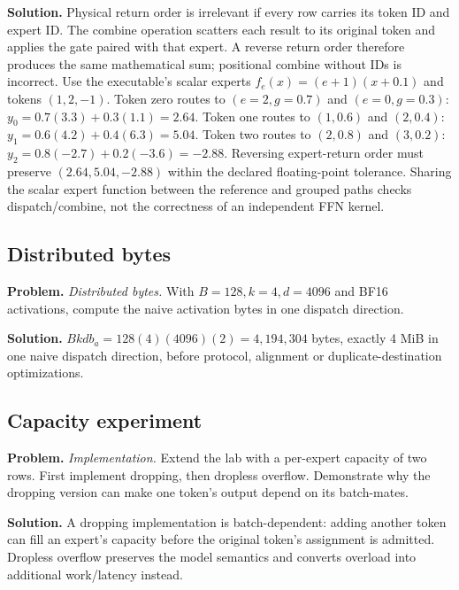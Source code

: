 \textbf{Solution.} Physical return order is irrelevant if every row carries its token ID and expert ID.
The combine operation scatters each result to its original token and applies the gate
paired with that expert. A reverse return order therefore produces the same mathematical
sum; positional combine without IDs is incorrect.
Use the executable's scalar experts $f_e(x)=(e+1)(x+0.1)$ and tokens
$(1,2,-1)$. Token zero routes to $(e=2,g=0.7)$ and $(e=0,g=0.3)$:
$y_0=0.7(3.3)+0.3(1.1)=2.64$. Token one routes to $(1,0.6)$
and $(2,0.4)$: $y_1=0.6(4.2)+0.4(6.3)=5.04$. Token two
routes to $(2,0.8)$ and $(3,0.2)$:
$y_2=0.8(-2.7)+0.2(-3.6)=-2.88$.
Reversing expert-return order must preserve $(2.64,5.04,-2.88)$
within the declared floating-point tolerance. Sharing the scalar expert
function between the reference and grouped paths checks dispatch/combine,
not the correctness of an independent FFN kernel.

\subsection{Distributed bytes}
\textbf{Problem.} \emph{Distributed bytes.} With $B=128,k=4,d=4096$ and BF16 activations, compute
the naive activation bytes in one dispatch direction.

\textbf{Solution.} $Bkd b_a=128(4)(4096)(2)=4{,}194{,}304$ bytes, exactly 4 MiB in one naive dispatch
direction, before protocol, alignment or duplicate-destination optimizations.

\subsection{Capacity experiment}
\textbf{Problem.} \emph{Implementation.} Extend the lab with a per-expert capacity of two rows.
First implement dropping, then dropless overflow. Demonstrate why the dropping version
can make one token's output depend on its batch-mates.

\textbf{Solution.} A dropping implementation is batch-dependent: adding another token can fill an expert's
capacity before the original token's assignment is admitted. Dropless overflow preserves
the model semantics and converts overload into additional work/latency instead.
